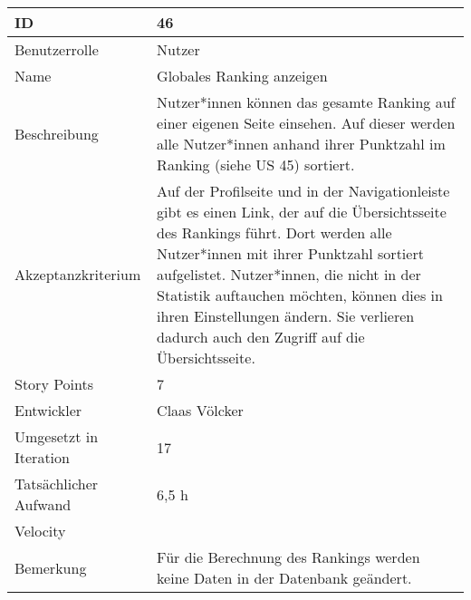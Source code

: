 \begin{tabularx}{\textwidth}{|p{}|X|}
	\hline
	ID & 46\\
	\hline
	Benutzerrolle & Nutzer\\
	\hline
	Name & Globales Ranking anzeigen\\
	\hline
	Beschreibung & Nutzer*innen können das gesamte Ranking auf einer eigenen Seite einsehen. Auf dieser werden alle Nutzer*innen anhand ihrer Punktzahl im Ranking (siehe US 45) sortiert.\\
	\hline
	Akzeptanzkriterium & Auf der Profilseite und in der Navigationleiste gibt es einen Link, der auf die Übersichtsseite des Rankings führt. Dort werden alle Nutzer*innen mit ihrer Punktzahl sortiert aufgelistet. Nutzer*innen, die nicht in der Statistik auftauchen möchten, können dies in ihren Einstellungen ändern. Sie verlieren dadurch auch den Zugriff auf die Übersichtsseite.\\
	\hline
	Story Points & 7\\
	\hline
	Entwickler & Claas Völcker\\
	\hline
	Umgesetzt in Iteration & 17\\
	\hline
	Tatsächlicher Aufwand & 6,5 h\\
	\hline
	Velocity & \\
	\hline
	Bemerkung & Für die Berechnung des Rankings werden keine Daten in der Datenbank geändert.\\
	\hline
\end{tabularx}
\vspace{20pt}
